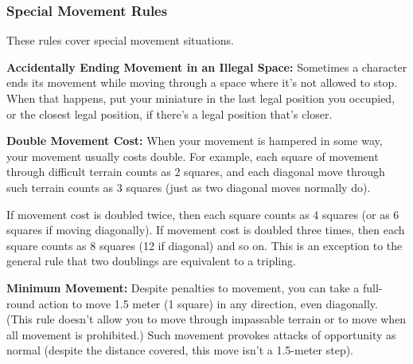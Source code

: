 \subsubsection{Special Movement Rules}
These rules cover special movement situations.

\textbf{Accidentally Ending Movement in an Illegal Space:} Sometimes a character ends its movement while moving through a space where it's not allowed to stop. When that happens, put your miniature in the last legal position you occupied, or the closest legal position, if there's a legal position that's closer.

\textbf{Double Movement Cost:} When your movement is hampered in some way, your movement usually costs double. For example, each square of movement through difficult terrain counts as 2 squares, and each diagonal move through such terrain counts as 3 squares (just as two diagonal moves normally do).

If movement cost is doubled twice, then each square counts as 4 squares (or as 6 squares if moving diagonally). If movement cost is doubled three times, then each square counts as 8 squares (12 if diagonal) and so on. This is an exception to the general rule that two doublings are equivalent to a tripling.

\textbf{Minimum Movement:} Despite penalties to movement, you can take a full-round action to move 1.5 meter (1 square) in any direction, even diagonally. (This rule doesn't allow you to move through impassable terrain or to move when all movement is prohibited.) Such movement provokes attacks of opportunity as normal (despite the distance covered, this move isn't a 1.5-meter step).